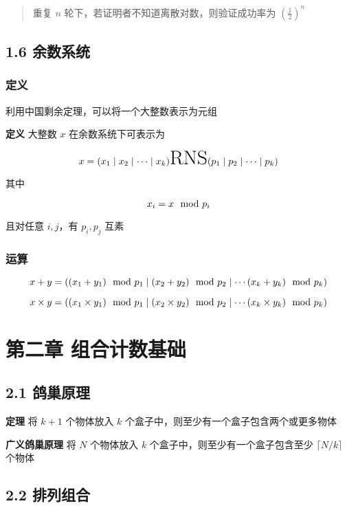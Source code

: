 \begin{quote}
重复 \(n\) 轮下，若证明者不知道离散对数，则验证成功率为
\(\left(\frac{1}{2}\right)^n\)
\end{quote}

\subsection{1.6 余数系统}\label{ux4f59ux6570ux7cfbux7edf}

\subsubsection{定义}\label{ux5b9aux4e49}

利用中国剩余定理，可以将一个大整数表示为元组

\textbf{定义} 大整数 \(x\) 在余数系统下可表示为

\[
\huge x=(x_1\mid x_2\mid \cdots\mid x_k)\text{RNS}(p_1\mid p_2\mid \cdots\mid p_k)
\]

其中

\[
\huge x_i=x\mod p_i
\]

且对任意 \(i,j\)，有 \(p_i,p_j\) 互素

\subsubsection{运算}\label{ux8fd0ux7b97}

\[
\large x+y=((x_1+y_1)\mod p_1\mid (x_2+y_2)\mod p_2\mid \cdots(x_k+y_k)\mod p_k)
\]

\[
\large x\times y=((x_1\times y_1)\mod p_1\mid (x_2\times y_2)\mod p_2\mid \cdots(x_k\times y_k)\mod p_k)
\]

\section{第二章
组合计数基础}\label{ux7b2cux4e8cux7ae0-ux7ec4ux5408ux8ba1ux6570ux57faux7840}

\subsection{2.1 鸽巢原理}\label{ux9e3dux5de2ux539fux7406}

\textbf{定理} 将 \(k+1\) 个物体放入 \(k\)
个盒子中，则至少有一个盒子包含两个或更多物体

\textbf{广义鸽巢原理} 将 \(N\) 个物体放入 \(k\)
个盒子中，则至少有一个盒子包含至少 \(\lceil N/k\rceil\) 个物体

\subsection{2.2 排列组合}\label{ux6392ux5217ux7ec4ux5408}

